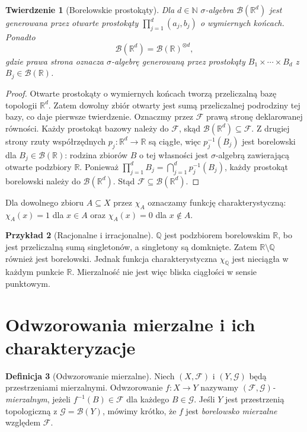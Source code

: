 \documentclass[11pt,a4paper,oneside]{book}
\numberwithin{equation}{chapter}
\theoremstyle{plain}
\newtheorem{twierdzenie}{Twierdzenie}[chapter]
\theoremstyle{definition}
\newtheorem{definicja}[twierdzenie]{Definicja}
\newtheorem{przyklad}[twierdzenie]{Przykład}
\theoremstyle{remark}
\begin{document}
\begin{twierdzenie}[Borelowskie prostokąty]
\label{thm:borel-Rd}
Dla $d\in\mathbb N$ $\sigma$-algebra $\mathcal B(\mathbb R^d)$
jest generowana przez otwarte prostokąty
$\prod_{j=1}^d(a_j,b_j)$ o wymiernych końcach. Ponadto
\[
\mathcal B(\mathbb R^d)=\mathcal B(\mathbb R)^{\otimes d},
\]
gdzie prawa strona oznacza $\sigma$-algebrę generowaną przez
prostokąty $B_1\times\cdots\times B_d$ z $B_j\in\mathcal B(\mathbb R)$.
\end{twierdzenie}
\begin{proof}
Otwarte prostokąty o wymiernych końcach tworzą przeliczalną bazę
topologii $\mathbb R^d$. Zatem dowolny zbiór otwarty jest sumą
przeliczalnej podrodziny tej bazy, co daje pierwsze twierdzenie.
Oznaczmy przez $\mathcal F$ prawą stronę deklarowanej równości.
Każdy prostokąt bazowy należy do $\mathcal F$, skąd
$\mathcal B(\mathbb R^d)\subseteq\mathcal F$.
Z drugiej strony rzuty współrzędnych $p_j:\mathbb R^d\to\mathbb R$
są ciągłe, więc $p_j^{-1}(B_j)$ jest borelowski dla
$B_j\in\mathcal B(\mathbb R)$: rodzina zbiorów $B$ o tej
własności jest $\sigma$-algebrą zawierającą otwarte podzbiory
$\mathbb R$. Ponieważ
$\prod_{j=1}^dB_j=\bigcap_{j=1}^dp_j^{-1}(B_j)$,
każdy prostokąt borelowski należy do $\mathcal B(\mathbb R^d)$.
Stąd $\mathcal F\subseteq\mathcal B(\mathbb R^d)$.
\end{proof}

Dla dowolnego zbioru $A\subseteq X$ przez $\chi_A$ oznaczamy
funkcję charakterystyczną: $\chi_A(x)=1$ dla $x\in A$
oraz $\chi_A(x)=0$ dla $x\notin A$.

\begin{przyklad}[Racjonalne i irracjonalne]
$\mathbb Q$ jest podzbiorem borelowskim $\mathbb R$, bo jest
przeliczalną sumą singletonów, a singletony są domknięte.
Zatem $\mathbb R\setminus\mathbb Q$ również jest borelowski.
Jednak funkcja charakterystyczna $\chi_{\mathbb Q}$ jest nieciągła
w każdym punkcie $\mathbb R$. Mierzalność nie jest więc bliska
ciągłości w sensie punktowym.
\end{przyklad}

\section{Odwzorowania mierzalne i ich charakteryzacje}

\begin{definicja}[Odwzorowanie mierzalne]
\label{def:measurable-map}
Niech $(X,\mathcal F)$ i $(Y,\mathcal G)$ będą przestrzeniami
mierzalnymi. Odwzorowanie $f:X\to Y$ nazywamy
\emph{$(\mathcal F,\mathcal G)$-mierzalnym}, jeżeli
$f^{-1}(B)\in\mathcal F$ dla każdego $B\in\mathcal G$.
Jeśli $Y$ jest przestrzenią topologiczną z
$\mathcal G=\mathcal B(Y)$, mówimy krótko, że $f$ jest
\emph{borelowsko mierzalne} względem $\mathcal F$.
\end{definicja}
\end{document}
